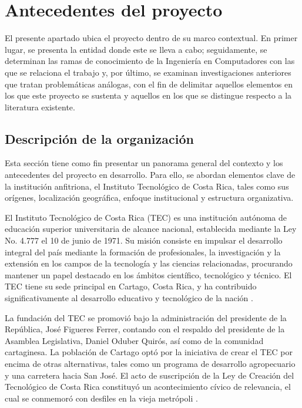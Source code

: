 \section{Antecedentes del proyecto}

El presente apartado ubica el proyecto dentro de su marco contextual.
En primer lugar, se presenta la entidad donde este se lleva a cabo; seguidamente, se determinan las ramas de conocimiento de la Ingeniería en Computadores con las que se relaciona el trabajo y, por último, se examinan investigaciones anteriores que tratan problemáticas análogas, con el fin de delimitar aquellos elementos en los que este proyecto se sustenta y aquellos en los que se distingue respecto a la literatura existente.


\subsection{Descripción de la organización}

Esta sección tiene como fin presentar un panorama general del contexto y los antecedentes del proyecto en desarrollo.
Para ello, se abordan elementos clave de la institución anfitriona, el Instituto Tecnológico de Costa Rica, tales como sus orígenes, localización geográfica, enfoque institucional y estructura organizativa.

El Instituto Tecnológico de Costa Rica (TEC) es una institución autónoma de educación superior universitaria de alcance nacional, establecida mediante la Ley No. 4.777 el 10 de junio de 1971.
Su misión consiste en impulsar el desarrollo integral del país mediante la formación de profesionales, la investigación y la extensión en los campos de la tecnología y las ciencias relacionadas, procurando mantener un papel destacado en los ámbitos científico, tecnológico y técnico.
El TEC tiene su sede principal en Cartago, Costa Rica, y ha contribuido significativamente al desarrollo educativo y tecnológico de la nación \cite{que_es_el_tec}.

La fundación del TEC se promovió bajo la administración del presidente de la República, José Figueres Ferrer, contando con el respaldo del presidente de la Asamblea Legislativa, Daniel Oduber Quirós, así como de la comunidad cartaginesa.
La población de Cartago optó por la iniciativa de crear el TEC por encima de otras alternativas, tales como un programa de desarrollo agropecuario y una carretera hacia San José.
El acto de suscripción de la Ley de Creación del Tecnológico de Costa Rica constituyó un acontecimiento cívico de relevancia, el cual se conmemoró con desfiles en la vieja metrópoli \cite{que_es_el_tec}.

